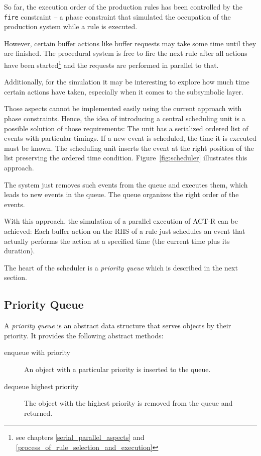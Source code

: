 So far, the execution order of the production rules has been controlled by the \verb|fire| constraint -- a phase constraint that simulated the occupation of the production system while a rule is executed.

However, certain buffer actions like buffer requests may take some time until they are finished. The procedural system is free to fire the next rule after all actions have been started\footnote{see chapters \ref{serial_parallel_aspects} and \ref{process_of_rule_selection_and_execution}} and the requests are performed in parallel to that.

Additionally, for the simulation it may be interesting to explore how much time certain actions have taken, especially when it comes to the subsymbolic layer.

Those aspects cannot be implemented easily using the current approach with phase constraints. Hence, the idea of introducing a central scheduling unit is a possible solution of those requirements: The unit has a serialized ordered list of events with particular timings. If a new event is scheduled, the time it is executed must be known. The scheduling unit inserts the event at the right position of the list preserving the ordered time condition. Figure~\ref{fig:scheduler} illustrates this approach.

The system just removes such events from the queue and executes them, which leads to new events in the queue. The queue organizes the right order of the events.

With this approach, the simulation of a parallel execution of ACT-R can be achieved: Each buffer action on the RHS of a rule just schedules an event that actually performs the action at a specified time (the current time plus its duration). 

The heart of the scheduler is a \emph{priority queue} which is described in the next section.

\subsection{Priority Queue}

A \emph{priority queue} is an abstract data structure that serves objects by their priority. It provides the following abstract methods:

\begin{description}
 \item[enqueue with priority] An object with a particular priority is inserted to the queue. 
 \item[dequeue highest priority] The object with the highest priority is removed from the queue and returned.
\end{description}


